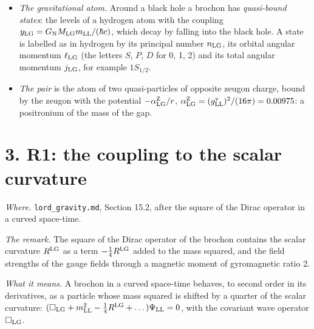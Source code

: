 \documentclass[
  10pt,
]{article}
\begin{document}
\begin{itemize}
  \emph{tetrad}, four orthonormal vectors at each point (Lord's
  \emph{reference vectors}); the metric, the curvature and the spin
  connection follow from it. The \emph{Schwarzschild} space-time is that
  of a black hole of constant mass \(M_{\rm LG}\) that does not rotate,
  with the \emph{gravitational radius}
  \(\mathcal M_{\rm LG}=G_{\rm N}M_{\rm LG}\) and the horizon
  \(r=2\mathcal M_{\rm LG}\); the \emph{Vaidya} space-time is that of a
  black hole whose mass changes because radiation falls in.
\item
  \emph{The gravitational atom.} Around a black hole a brochon has
  \emph{quasi-bound states}: the levels of a hydrogen atom with the
  coupling \(y_{\rm LG}=G_{\rm N}M_{\rm LG}m_{\rm LL}/(\hbar c)\), which
  decay by falling into the black hole. A state is labelled as in
  hydrogen by its principal number \(n_{\rm LG}\), its orbital angular
  momentum \(\ell_{\rm LG}\) (the letters \(S\), \(P\), \(D\) for 0, 1,
  2) and its total angular momentum \(j_{\rm LG}\), for example
  \(1S_{1/2}\).
\item
  \emph{The pair} is the atom of two quasi-particles of opposite zeugon
  charge, bound by the zeugon with the potential
  \(-\alpha^{\rm Z}_{\rm LG}/r\),
  \(\alpha^{\rm Z}_{\rm LG}=(g^{\rm v}_{\rm LL})^2/(16\pi)=0.00975\): a
  positronium of the mass of the gap.
\end{itemize}

\hypertarget{r1-the-coupling-to-the-scalar-curvature}{%
\section{3. R1: the coupling to the scalar
curvature}\label{r1-the-coupling-to-the-scalar-curvature}}

\emph{Where.} \texttt{lord\_gravity.md}, Section 15.2, after the square
of the Dirac operator in a curved space-time.

\emph{The remark.} The square of the Dirac operator of the brochon
contains the scalar curvature \(R^{\rm LG}\) as a term
\(-\tfrac14R^{\rm LG}\) added to the mass squared, and the field
strengths of the gauge fields through a magnetic moment of gyromagnetic
ratio 2.

\emph{What it means.} A brochon in a curved space-time behaves, to
second order in its derivatives, as a particle whose mass squared is
shifted by a quarter of the scalar curvature:
\((\Box_{\rm LG}+m_{\rm LL}^2-\tfrac14R^{\rm LG}+\dots)\Psi_{\rm LL}=0\),
with the covariant wave operator \(\Box_{\rm LG}\).
\end{document}
